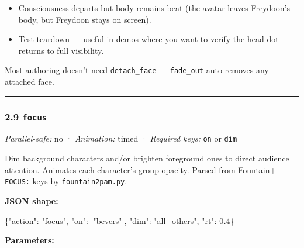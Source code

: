 \documentclass[
  11pt,
]{book}
\newenvironment{Shaded}{}{}
\newcommand{\DataTypeTok}[1]{\textcolor[rgb]{0.56,0.13,0.00}{#1}}
\newcommand{\DecValTok}[1]{\textcolor[rgb]{0.25,0.63,0.44}{#1}}
\newcommand{\ErrorTok}[1]{\textcolor[rgb]{1.00,0.00,0.00}{\textbf{#1}}}
\newcommand{\FunctionTok}[1]{\textcolor[rgb]{0.02,0.16,0.49}{#1}}
\newcommand{\OtherTok}[1]{\textcolor[rgb]{0.00,0.44,0.13}{#1}}
\newcommand{\StringTok}[1]{\textcolor[rgb]{0.25,0.44,0.63}{#1}}
\providecommand{\tightlist}{%
  \setlength{\itemsep}{0pt}\setlength{\parskip}{0pt}}
\begin{document}
\begin{itemize}
\tightlist
\item
  Consciousness-departs-but-body-remains beat (the avatar leaves
  Freydoon's body, but Freydoon stays on screen).
\item
  Test teardown --- useful in demos where you want to verify the head
  dot returns to full visibility.
\end{itemize}

Most authoring doesn't need \texttt{detach\_face} --- \texttt{fade\_out}
auto-removes any attached face.

\begin{center}\rule{0.5\linewidth}{0.5pt}\end{center}

\subsubsection{\texorpdfstring{2.9
\texttt{focus}}{2.9 focus}}\label{focus}

\emph{Parallel-safe:} no · \emph{Animation:} timed · \emph{Required
keys:} \texttt{on} or \texttt{dim}

Dim background characters and/or brighten foreground ones to direct
audience attention. Animates each character's group opacity. Parsed from
Fountain+ \texttt{FOCUS:} keys by \texttt{fountain2pam.py}.

\textbf{JSON shape:}

\begin{Shaded}
\begin{Highlighting}[]
\FunctionTok{\{}\DataTypeTok{"action"}\FunctionTok{:} \StringTok{"focus"}\FunctionTok{,} \DataTypeTok{"on"}\FunctionTok{:} \OtherTok{[}\StringTok{"bevers"}\OtherTok{]}\FunctionTok{,} \DataTypeTok{"dim"}\FunctionTok{:} \StringTok{"all\_others"}\FunctionTok{,} \DataTypeTok{"rt"}\FunctionTok{:} \DecValTok{0}\ErrorTok{.}\DecValTok{4}\FunctionTok{\}}
\end{Highlighting}
\end{Shaded}

\textbf{Parameters:}
\end{document}
